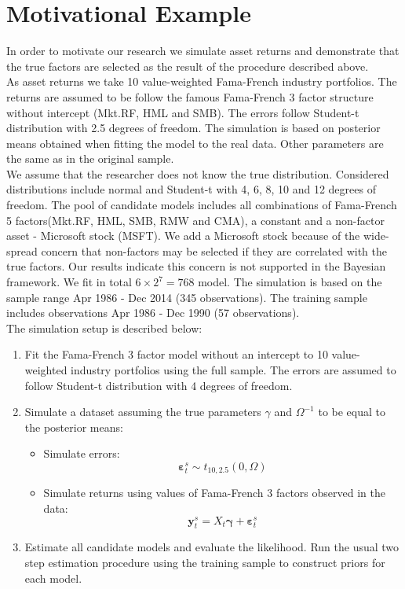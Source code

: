 \documentclass[12pt]{article}
\begin{document}
\section{Motivational Example}
In order to motivate our research we simulate asset returns and demonstrate that the true factors are selected as the result of the procedure described above. \\
As asset returns we take 10 value-weighted Fama-French industry portfolios. The returns are assumed to be follow the famous Fama-French 3 factor structure without intercept (Mkt.RF, HML and SMB). The errors follow Student-t distribution with 2.5 degrees of freedom. The simulation is based on posterior means obtained when fitting the model to the real data. Other parameters are the same as in the original sample. \\
We assume that the researcher does not know the true distribution. Considered distributions include normal and Student-t with 4, 6, 8, 10 and 12 degrees of freedom. The pool of candidate models includes all combinations of Fama-French 5 factors(Mkt.RF, HML, SMB, RMW and CMA), a constant and a non-factor asset - Microsoft stock (MSFT). We add a Microsoft stock  because of the wide-spread concern that non-factors may be selected if they are correlated with the true factors. Our results indicate this concern is not supported in the Bayesian framework. We fit in total $6\times 2^{7} = 768$ model. The simulation is based on the sample range Apr 1986 - Dec 2014 (345 observations). The training sample includes observations Apr 1986 - Dec 1990 (57 observations). \\
The simulation setup is described below:
\begin{enumerate}
	\item Fit the Fama-French 3 factor model without an intercept to 10 value-weighted industry portfolios using the full sample. The errors are assumed to follow Student-t distribution with 4 degrees of freedom. 
	\item Simulate a dataset assuming the true parameters  $\gamma$ and $\Omega^{-1} $ to be equal to the posterior means:
	\begin{itemize}
		\item Simulate errors:
		\begin{equation*}
		\boldsymbol{\varepsilon}^s_{t}\sim t_{10,2.5 }\left( 0,\Omega \right)
		\end{equation*}
		\item Simulate returns using values of Fama-French 3 factors observed in the data:
		\begin{equation*}
		\mathbf{y}_t^s = X_t \boldsymbol{\gamma} + \boldsymbol{\varepsilon}^s_t
		\end{equation*}
	\end{itemize}
	\item Estimate all candidate models and evaluate the likelihood. Run the usual two step estimation procedure using the training sample to construct priors for each model.  
\end{enumerate}
\end{document}
